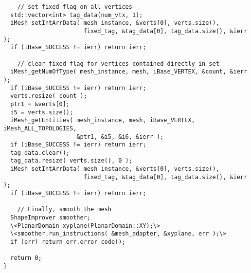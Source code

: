 \begin{lstlisting}
    // set fixed flag on all vertices
  std::vector<int> tag_data(num_vtx, 1);
  iMesh_setIntArrData( mesh_instance, &verts[0], verts.size(), 
                       fixed_tag, &tag_data[0], tag_data.size(), &ierr );
  if (iBase_SUCCESS != ierr) return ierr;

    // clear fixed flag for vertices contained directly in set
  iMesh_getNumOfType( mesh_instance, mesh, iBase_VERTEX, &count, &ierr );
  if (iBase_SUCCESS != ierr) return ierr;
  verts.resize( count );
  ptr1 = &verts[0];
  i5 = verts.size();
  iMesh_getEntities( mesh_instance, mesh, iBase_VERTEX, iMesh_ALL_TOPOLOGIES,
                     &ptr1, &i5, &i6, &ierr );
  if (iBase_SUCCESS != ierr) return ierr;
  tag_data.clear();
  tag_data.resize( verts.size(), 0 );
  iMesh_setIntArrData( mesh_instance, &verts[0], verts.size(), 
                       fixed_tag, &tag_data[0], tag_data.size(), &ierr );
  if (iBase_SUCCESS != ierr) return ierr;

    // Finally, smooth the mesh
  ShapeImprover smoother;
  \<PlanarDomain xyplane(PlanarDomain::XY);\>
  \<smoother.run_instructions( &mesh_adapter, &xyplane, err );\>
  if (err) return err.error_code();

  return 0;
}
\end{lstlisting}

